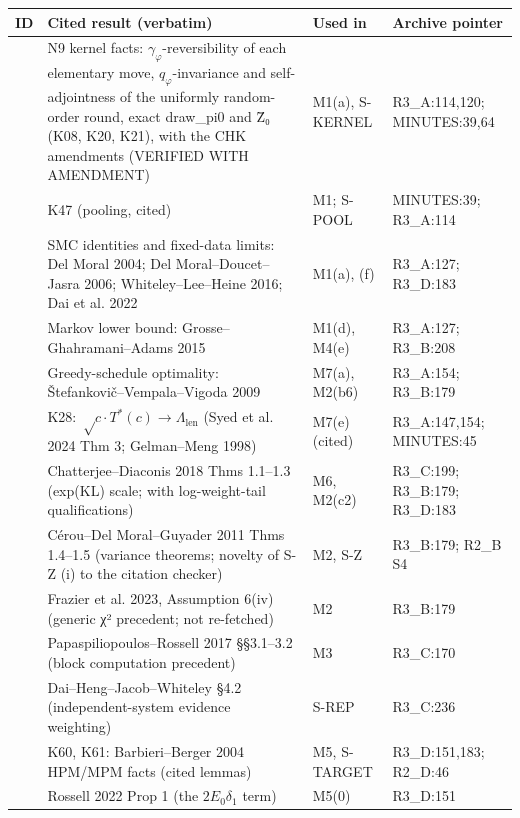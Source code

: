 {\footnotesize
\begin{xltabular}{\textwidth}{@{}>{\raggedright\arraybackslash}p{1.0cm} >{\raggedright\arraybackslash}X >{\raggedright\arraybackslash}p{2.6cm} >{\raggedright\arraybackslash}p{2.9cm}@{}}
\toprule
ID & Cited result (verbatim) & Used in & Archive pointer \\
\midrule
\endhead
{} & N9 kernel facts: $γ_φ$-reversibility of each elementary move, $q_φ$-invariance and self-adjointness of the uniformly random-order round, exact draw\_pi0 and Z̄₀ (K08, K20, K21), with the CHK amendments (VERIFIED WITH AMENDMENT) & M1(a), S-KERNEL & R3\_A:114,120; MINUTES:39,64 \\
 & K47 (pooling, cited) & M1; S-POOL & MINUTES:39; R3\_A:114 \\
 & SMC identities and fixed-data limits: Del Moral 2004; Del Moral–Doucet–Jasra 2006; Whiteley–Lee–Heine 2016; Dai et al. 2022 & M1(a), (f) & R3\_A:127; R3\_D:183 \\
 & Markov lower bound: Grosse–Ghahramani–Adams 2015 & M1(d), M4(e) & R3\_A:127; R3\_B:208 \\
 & Greedy-schedule optimality: Štefankovič–Vempala–Vigoda 2009 & M7(a), M2(b6) & R3\_A:154; R3\_B:179 \\
 & K28: $√c\cdot T^*(c) → Λ_{\mathrm{len}}$ (Syed et al. 2024 Thm 3; Gelman–Meng 1998) & M7(e) (cited) & R3\_A:147,154; MINUTES:45 \\
 & Chatterjee–Diaconis 2018 Thms 1.1–1.3 (exp(KL) scale; with log-weight-tail qualifications) & M6, M2(c2) & R3\_C:199; R3\_B:179; R3\_D:183 \\
 & Cérou–Del Moral–Guyader 2011 Thms 1.4–1.5 (variance theorems; novelty of S-Z (i) to the citation checker) & M2, S-Z & R3\_B:179; R2\_B S4 \\
 & Frazier et al. 2023, Assumption 6(iv) (generic χ² precedent; not re-fetched) & M2 & R3\_B:179 \\
 & Papaspiliopoulos–Rossell 2017 §§3.1–3.2 (block computation precedent) & M3 & R3\_C:170 \\
 & Dai–Heng–Jacob–Whiteley §4.2 (independent-system evidence weighting) & S-REP & R3\_C:236 \\
 & K60, K61: Barbieri–Berger 2004 HPM/MPM facts (cited lemmas) & M5, S-TARGET & R3\_D:151,183; R2\_D:46 \\
 & Rossell 2022 Prop 1 (the $2E_0δ_1$ term) & M5(0) & R3\_D:151 \\

\end{xltabular}}
